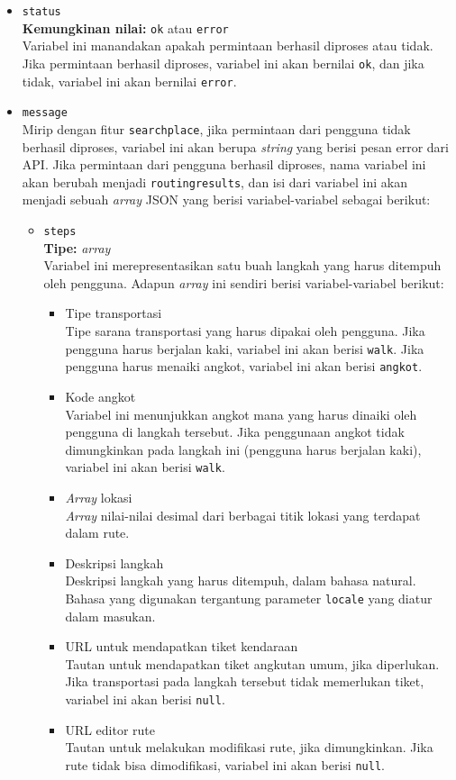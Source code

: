 \begin{itemize}
	\item \verb|status|\\
	\textbf{Kemungkinan nilai:} \verb|ok| atau \verb|error|\\
	Variabel ini manandakan apakah permintaan berhasil diproses atau tidak. Jika permintaan berhasil diproses, variabel ini akan bernilai \verb|ok|, dan jika tidak, variabel ini akan bernilai \verb|error|.
	\item \verb|message|\\
	Mirip dengan fitur \verb|searchplace|, jika permintaan dari pengguna tidak berhasil diproses, variabel ini akan berupa \textit{string} yang berisi pesan error dari API. Jika permintaan dari pengguna berhasil diproses, nama variabel ini akan berubah menjadi \verb|routingresults|, dan isi dari variabel ini akan menjadi sebuah \textit{array} JSON yang berisi variabel-variabel sebagai berikut:
	\begin{itemize}
		\item \verb|steps|\\
		\textbf{Tipe:} \textit{array}\\
		Variabel ini merepresentasikan satu buah langkah yang harus ditempuh oleh pengguna. Adapun \textit{array} ini sendiri berisi variabel-variabel berikut:
		
		\begin{itemize}
			\item Tipe transportasi\\
			Tipe sarana transportasi yang harus dipakai oleh pengguna. Jika pengguna harus berjalan kaki, variabel ini akan berisi \verb|walk|. Jika pengguna harus menaiki angkot, variabel ini akan berisi \verb|angkot|.
			\item Kode angkot\\
			Variabel ini menunjukkan angkot mana yang harus dinaiki oleh pengguna di langkah tersebut. Jika penggunaan angkot tidak dimungkinkan pada langkah ini (pengguna harus berjalan kaki), variabel ini akan berisi \verb|walk|.
			\item \textit{Array} \latlon lokasi\\
			\textit{Array} nilai-nilai desimal \latlon dari berbagai titik lokasi yang terdapat dalam rute.
			\item Deskripsi langkah\\
			Deskripsi langkah yang harus ditempuh, dalam bahasa natural. Bahasa yang digunakan tergantung parameter \verb|locale| yang diatur dalam masukan.
			\item URL untuk mendapatkan tiket kendaraan\\
			Tautan untuk mendapatkan tiket angkutan umum, jika diperlukan. Jika transportasi pada langkah tersebut tidak memerlukan tiket, variabel ini akan berisi \verb|null|.
			\item URL editor rute\\
			Tautan untuk melakukan modifikasi rute, jika dimungkinkan. Jika rute tidak bisa dimodifikasi, variabel ini akan berisi \verb|null|.
		\end{itemize}
		

\end{itemize}
\end{itemize}
